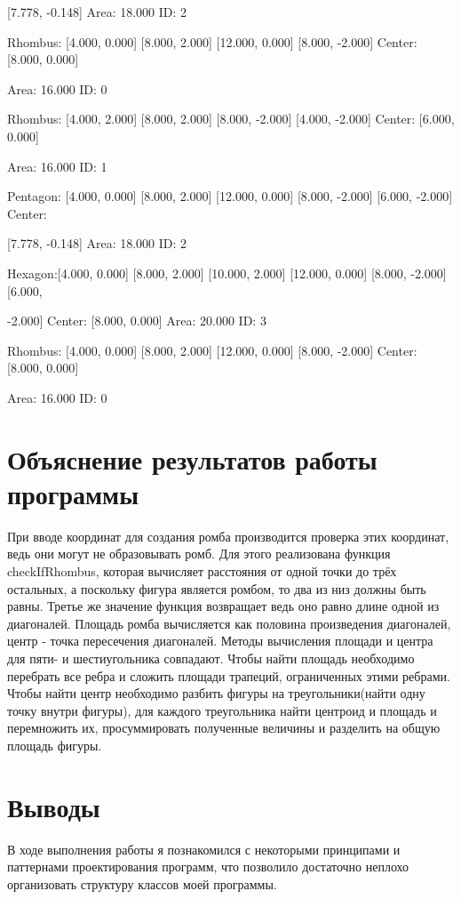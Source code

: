\documentclass[a4paper, 12pt]{article}
\begin{document}
[7.778, -0.148] Area: 18.000 ID: 2

Rhombus: [4.000, 0.000] [8.000, 2.000] [12.000, 0.000] [8.000, -2.000] Center: [8.000, 0.000] 

Area: 16.000 ID: 0

Rhombus: [4.000, 2.000] [8.000, 2.000] [8.000, -2.000] [4.000, -2.000] Center: [6.000, 0.000] 

Area: 16.000 ID: 1

Pentagon: [4.000, 0.000] [8.000, 2.000] [12.000, 0.000] [8.000, -2.000] [6.000, -2.000] Center: 

[7.778, -0.148] Area: 18.000 ID: 2

Hexagon:[4.000, 0.000] [8.000, 2.000] [10.000, 2.000] [12.000, 0.000] [8.000, -2.000] [6.000, 

-2.000] Center: [8.000, 0.000] Area: 20.000 ID: 3

Rhombus: [4.000, 0.000] [8.000, 2.000] [12.000, 0.000] [8.000, -2.000] Center: [8.000, 0.000] 

Area: 16.000 ID: 0

\section{Объяснение результатов работы программы}

При вводе координат для создания ромба производится проверка этих координат, ведь они могут не образовывать ромб. Для этого реализована функция checkIfRhombus, которая вычисляет расстояния от одной точки до трёх остальных, а поскольку фигура является ромбом, то два из низ должны быть равны. Третье же значение функция возвращает ведь оно равно длине одной из диагоналей. Площадь ромба вычисляется как половина произведения диагоналей, центр - точка пересечения диагоналей. Методы вычисления площади и центра для пяти- и шестиугольника совпадают. Чтобы найти площадь необходимо перебрать все ребра и сложить площади трапеций, ограниченных этими ребрами. Чтобы найти центр необходимо разбить фигуры на треугольники(найти одну точку внутри фигуры), для каждого треугольника найти центроид и площадь и перемножить их, просуммировать полученные величины и разделить на общую площадь фигуры.   

\newpage
\section{Выводы}

В ходе выполнения работы я познакомился с некоторыми принципами и паттернами проектирования программ, что позволило достаточно неплохо организовать структуру классов моей программы.
\end{document}
